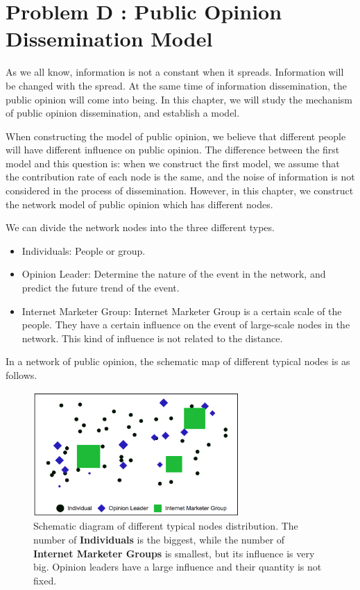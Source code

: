 \documentclass[a4paper,11pt]{article}
\begin{document}
\section{Problem D : Public Opinion Dissemination Model}
\par As we all know, information is not a constant when it spreads. Information will be changed with the spread. At the same time of information dissemination, the public opinion will come into being. In this chapter, we will study the mechanism of public opinion dissemination, and establish a model.
\par When constructing the model of public opinion, we believe that different people will have different influence on public opinion. The difference between the first model and this question is: when we construct the first model, we assume that the contribution rate of each node is the same, and the noise of information is not considered in the process of dissemination. However, in this chapter, we construct the network model of public opinion which has different nodes.
\par We can divide the network nodes into the three different types.

\begin{itemize}
\item Individuals: People or group.
\item Opinion Leader: Determine the nature of the event in the network, and predict the future trend of the event.
\item Internet Marketer Group: Internet Marketer Group is a certain scale of the people. They have a certain influence on the event of large-scale nodes in the network. This kind of influence is not related to the distance.
\end{itemize}



\par In a network of public opinion, the schematic map of different typical nodes is as follows.


\begin{figure}[h]%
    \centering 
    \includegraphics[width=0.7\textwidth]{./Pic/Unknown.png}
    \caption{Schematic diagram of different typical nodes distribution. The number of \textbf{Individuals} is the biggest, while the number of \textbf{Internet Marketer Groups} is smallest, but its influence is very big. Opinion leaders have a large influence and their quantity is not fixed.}
    \label{fig:Unknown}  
\end{figure}
\end{document}
